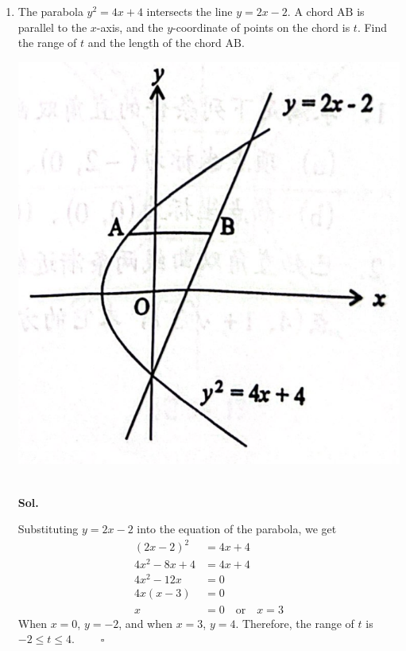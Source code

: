 \documentclass{report}
\newcommand{\sol}{\vspace{1em}\\\textbf{Sol.}}
\newcommand{\eos}{ \qquad \square}
\begin{document}
\begin{enumerate}
          \newpage
    \item The parabola $y^2=4x+4$ intersects the line $y=2x-2$. A chord $\mathrm{AB}$ is
          parallel to the $x$-axis, and the $y$-coordinate of points on the chord is $t$.
          Find the range of $t$ and the length of the chord $\mathrm{AB}$.
          \begin{center}
              \includegraphics[scale=0.25]{./assets/reex57.png}
          \end{center}
          \ \sol{}

          Substituting $y=2x-2$ into the equation of the parabola, we get
          \begin{align*}
              (2x-2)^2  & = 4x+4                          \\
              4x^2-8x+4 & = 4x+4                          \\
              4x^2-12x  & = 0                             \\
              4x(x-3)   & = 0                             \\
              x         & = 0 \quad \text{or} \quad x = 3
          \end{align*}
          When $x=0$, $y=-2$, and when $x=3$, $y=4$. Therefore, the range of $t$ is $-2 \leq t \leq 4$. $\eos$


\end{enumerate}
\end{document}
